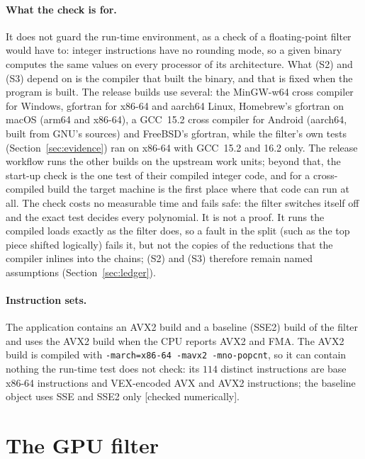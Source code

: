 \documentclass[10pt,a4paper]{article}
\newcommand{\code}[1]{\texttt{#1}}
\newcommand{\stnum}{\textsf{\small[checked numerically]}\xspace}
\theoremstyle{plain}
\theoremstyle{definition}
\begin{document}
\paragraph{What the check is for.}  It does not guard the run-time environment, as a check of a floating-point filter would have to: integer instructions have no
rounding mode, so a given binary computes the same values on every processor of its architecture.  What (S2) and (S3) depend on is the compiler that built the
binary, and that is fixed when the program is built.  The release builds use several: the MinGW-w64 cross compiler for Windows, gfortran for x86-64 and aarch64
Linux, Homebrew's gfortran on macOS (arm64 and x86-64), a GCC~15.2 cross compiler for Android (aarch64, built from GNU's sources) and FreeBSD's gfortran, while the filter's own tests
(Section~\ref{sec:evidence}) ran on x86-64 with GCC~15.2 and 16.2 only.  The release workflow runs the other builds on the upstream work units; beyond that, the
start-up check is the one test of their compiled integer code, and for a cross-compiled build the target machine is the first place where that code can run at all.  The check costs no measurable time and fails safe: the filter switches itself off and the exact test
decides every polynomial.  It is not a proof.  It runs the compiled loads exactly as the filter does, so a fault in the split (such as the top piece shifted
logically) fails it, but not the copies of the reductions that the compiler inlines into the chains; (S2) and (S3) therefore remain named assumptions
(Section~\ref{sec:ledger}).

\paragraph{Instruction sets.}  The application contains an AVX2 build and a baseline (SSE2) build of the filter and uses the AVX2 build when the CPU reports AVX2 and
FMA.  The AVX2 build is compiled with \code{-march=x86-64 -mavx2 -mno-popcnt}, so it can contain nothing the run-time test does not check: its $114$ distinct
instructions are base x86-64 instructions and VEX-encoded AVX and AVX2 instructions; the baseline object uses SSE and SSE2 only \stnum.

\section{The GPU filter}\label{sec:gpu}
\end{document}
